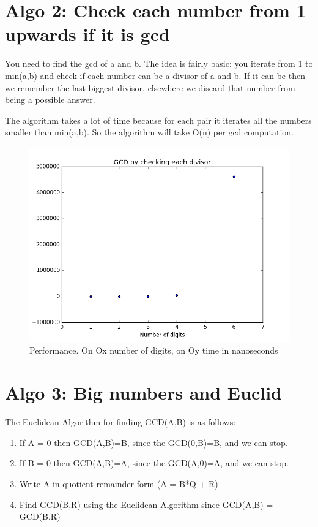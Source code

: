 \documentclass{article}
\begin{document}
\newpage
\section{Algo 2: Check each number from 1 upwards if it is gcd }

You need to find the gcd of a and b.
The idea is fairly basic: you iterate from 1 to min(a,b) and check if each number can be a divisor of a and b.
If it can be then we remember the last biggest divisor, elsewhere we discard that number from being a possible answer.

The algorithm takes a lot of time because for each pair it iterates all the numbers smaller than min(a,b). So the algorithm
will take O(n) per gcd computation.

\begin{figure}[H]
\caption{Performance. On Ox number of digits, on Oy time in nanoseconds}
\centering
\includegraphics{GCDEach}
\end{figure}


\newpage
\section{Algo 3: Big numbers and Euclid}

The Euclidean Algorithm for finding GCD(A,B) is as follows:

\begin{enumerate}
\item If A = 0 then GCD(A,B)=B, since the GCD(0,B)=B, and we can stop.  
\item If B = 0 then GCD(A,B)=A, since the GCD(A,0)=A, and we can stop.  
\item Write A in quotient remainder form (A = B*Q + R)
\item Find GCD(B,R) using the Euclidean Algorithm since GCD(A,B) = GCD(B,R)
\end{enumerate}
\end{document}
